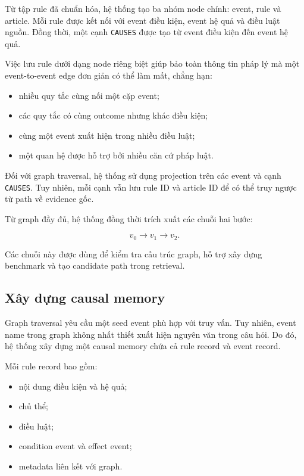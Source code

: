 Từ tập rule đã chuẩn hóa, hệ thống tạo ba nhóm node chính: event, rule và
article. Mỗi rule được kết nối với event điều kiện, event hệ quả và điều luật
nguồn. Đồng thời, một cạnh \texttt{CAUSES} được tạo từ event điều kiện đến
event hệ quả.

Việc lưu rule dưới dạng node riêng biệt giúp bảo toàn thông tin pháp lý mà
một event-to-event edge đơn giản có thể làm mất, chẳng hạn:

\begin{itemize}
    \item nhiều quy tắc cùng nối một cặp event;
    \item các quy tắc có cùng outcome nhưng khác điều kiện;
    \item cùng một event xuất hiện trong nhiều điều luật;
    \item một quan hệ được hỗ trợ bởi nhiều căn cứ pháp luật.
\end{itemize}

Đối với graph traversal, hệ thống sử dụng projection trên các event và cạnh
\texttt{CAUSES}. Tuy nhiên, mỗi cạnh vẫn lưu rule ID và article ID để có thể
truy ngược từ path về evidence gốc.

Từ graph đầy đủ, hệ thống đồng thời trích xuất các chuỗi hai bước:

\[
v_0 \rightarrow v_1 \rightarrow v_2.
\]

Các chuỗi này được dùng để kiểm tra cấu trúc graph, hỗ trợ xây dựng benchmark
và tạo candidate path trong retrieval.

\subsection{Xây dựng causal memory}

Graph traversal yêu cầu một seed event phù hợp với truy vấn. Tuy nhiên,
event name trong graph không nhất thiết xuất hiện nguyên văn trong câu hỏi.
Do đó, hệ thống xây dựng một causal memory chứa cả rule record và event
record.

Mỗi rule record bao gồm:

\begin{itemize}
    \item nội dung điều kiện và hệ quả;
    \item chủ thể;
    \item điều luật;
    \item condition event và effect event;
    \item metadata liên kết với graph.
\end{itemize}

